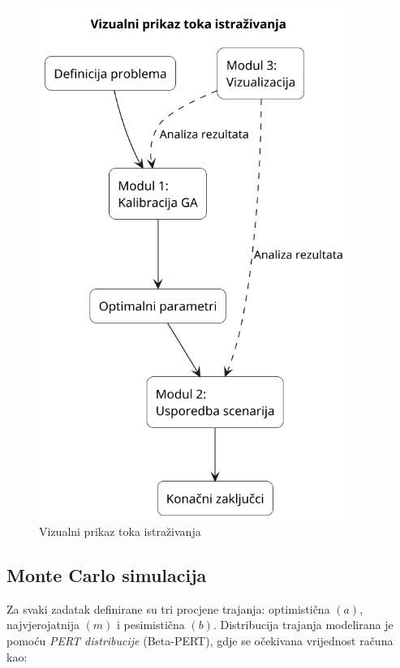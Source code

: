 \begin{figure}[H]
    \centering
    \includegraphics[width=0.9\textwidth]{slike/tijek_istrazivanja.png}
    \caption{Vizualni prikaz toka istraživanja}
    \label{tok istraživanja}
\end{figure}


\subsection{Monte Carlo simulacija}

Za svaki zadatak definirane su tri procjene trajanja: optimistična $(a)$, najvjerojatnija $(m)$ i pesimistična $(b)$.  
Distribucija trajanja modelirana je pomoću \textit{PERT distribucije} (Beta-PERT), gdje se očekivana vrijednost računa kao:

